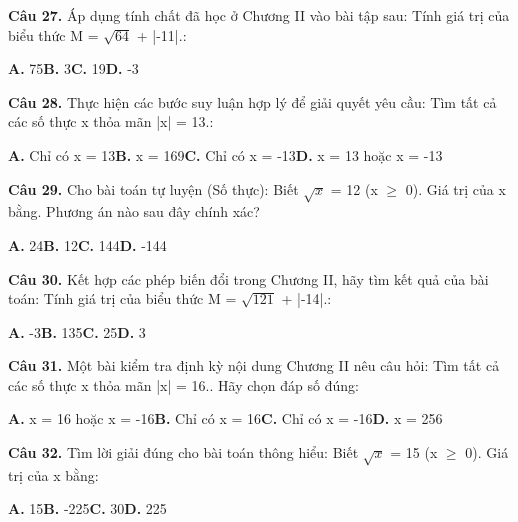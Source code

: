 \documentclass[11pt,a4paper]{article}
\begin{document}
\textbf{\color{primary} Câu 27.} Áp dụng tính chất đã học ở Chương II vào bài tập sau: Tính giá trị của biểu thức M = $\sqrt{64}$ + |-11|.:\par
\hspace*{1.5em}\textbf{A.} 75\quad\quad \textbf{B.} 3\quad\quad \textbf{C.} 19\quad\quad \textbf{D.} -3\par\vspace{2pt}
\textbf{\color{primary} Câu 28.} Thực hiện các bước suy luận hợp lý để giải quyết yêu cầu: Tìm tất cả các số thực x thỏa mãn |x| = 13.:\par
\hspace*{1.5em}\textbf{A.} Chỉ có x = 13\quad\quad \textbf{B.} x = 169\quad\quad \textbf{C.} Chỉ có x = -13\quad\quad \textbf{D.} x = 13 hoặc x = -13\par\vspace{2pt}
\textbf{\color{primary} Câu 29.} Cho bài toán tự luyện (Số thực): Biết $\sqrt{x}$ = 12 (x $\ge$ 0). Giá trị của x bằng. Phương án nào sau đây chính xác?\par
\hspace*{1.5em}\textbf{A.} 24\quad\quad \textbf{B.} 12\quad\quad \textbf{C.} 144\quad\quad \textbf{D.} -144\par\vspace{2pt}
\textbf{\color{primary} Câu 30.} Kết hợp các phép biến đổi trong Chương II, hãy tìm kết quả của bài toán: Tính giá trị của biểu thức M = $\sqrt{121}$ + |-14|.:\par
\hspace*{1.5em}\textbf{A.} -3\quad\quad \textbf{B.} 135\quad\quad \textbf{C.} 25\quad\quad \textbf{D.} 3\par\vspace{2pt}
\textbf{\color{primary} Câu 31.} Một bài kiểm tra định kỳ nội dung Chương II nêu câu hỏi: Tìm tất cả các số thực x thỏa mãn |x| = 16.. Hãy chọn đáp số đúng:\par
\hspace*{1.5em}\textbf{A.} x = 16 hoặc x = -16\quad\quad \textbf{B.} Chỉ có x = 16\quad\quad \textbf{C.} Chỉ có x = -16\quad\quad \textbf{D.} x = 256\par\vspace{2pt}
\textbf{\color{primary} Câu 32.} Tìm lời giải đúng cho bài toán thông hiểu: Biết $\sqrt{x}$ = 15 (x $\ge$ 0). Giá trị của x bằng:\par
\hspace*{1.5em}\textbf{A.} 15\quad\quad \textbf{B.} -225\quad\quad \textbf{C.} 30\quad\quad \textbf{D.} 225\par\vspace{2pt}
\end{document}
